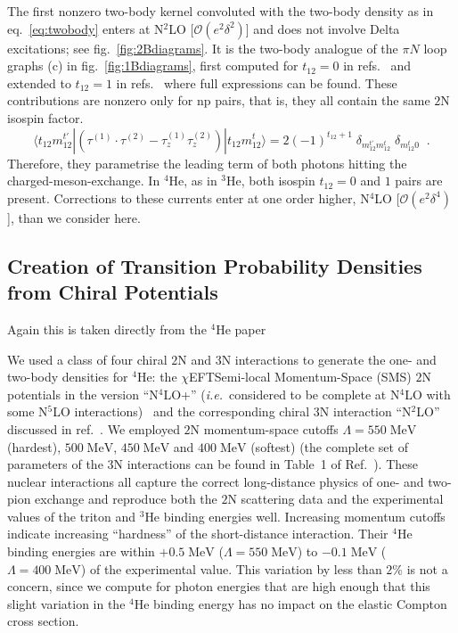 \documentclass[12pt]{article}
\newcommand{\ChiEFT}{$\chi$EFT\;}
\newcommand{\fourHe}{${}^{4} \mathrm{He}$\xspace}
\newcommand{\MeV}{\mathrm{MeV}}
\newcommand{\3}{\ss}
\newcommand{\ie}{\textit{i.e.}\xspace}
\newcommand{\NXLO}[1]{N\ensuremath{{}^{#1}}LO\xspace}
\newcommand{\threeHe}{\ensuremath{{}^3}He\xspace}
\newcommand{\N}{\mathrm{N}}
\newcommand{\calO}{\mathcal{O}} \newcommand{\calP}{\mathcal{P}}
\numberwithin{equation}{section}
\begin{document}
  The first nonzero two-body kernel convoluted with the two-body
  density as in eq.~\eqref{eq:twobody} enters at
  \NXLO{2} [$\calO(e^2 \delta^2)$]  and does not involve Delta
  excitations; see fig.~\ref{fig:2Bdiagrams}. It is the
  two-body analogue of the $\pi N$ loop graphs (c) in fig.~\ref{fig:1Bdiagrams},
  first computed for $t_{12}=0$ in refs.~\cite{Beane:1999uq,
  Beane:2004ra} and extended to $t_{12}=1$  in refs.~\cite{Choudhury:2007bh,
  Shukla:2008zc, ShuklaPhD} where full
  expressions can be found. These contributions are nonzero only for
  $\mathrm{np}$ pairs, that is, they all contain the same $2\N$ isospin factor.
  \begin{equation}
    \langle t_{12}m^{t\prime}_{12}|(\tau^{(1)} \cdot \tau^{(2)} -
    \tau^{(1)}_{z} \tau^{(2)}_{z})|t_{12}m^{t}_{12}\rangle=2(-1)^{t_{12}+1}\;
    \delta_{m^{t\prime}_{12}m^t_{12}}\;\delta_{m^t_{12}0}\;\;.
  \end{equation}
  Therefore, they parametrise the leading term of both photons hitting the
  charged-meson-exchange. In \fourHe, as in \threeHe, both isospin
  $t_{12}=0$ and $1$
  pairs are present. Corrections to these currents enter at one order higher,
  \NXLO{4} [$\calO(e^2\delta^4)$], than we consider here.
\subsection{Creation of Transition Probability Densities from
  Chiral Potentials}
\color{red} Again this is taken directly from the \fourHe paper \color{black}

\label{sec:potentials}

We used a class of four chiral $2$N and $3$N interactions to generate the one-
and two-body densities for \fourHe: the \ChiEFT Semi-local Momentum-Space (SMS)
$2\N$ potentials in the version ``\NXLO{4}+'' (\ie~considered to be complete at \NXLO{4} with
some \NXLO{5} interactions)~\cite{Reinert:2017usi} and the corresponding
chiral $3\N$ interaction ``\NXLO{2}'' discussed in ref.~\cite{Maris:2020qne}. We employed $2 \N$ momentum-space cutoffs $\Lambda=550\;\MeV$ (hardest),
$500\;\MeV$, $450\;\MeV$ and $400\;\MeV$ (softest) (the complete set of parameters of the 3N interactions can be found in Table~1 of Ref.~\cite{Le:2023bfj}). 
These nuclear interactions all capture the correct long-distance physics of one- and two-pion exchange and
reproduce both the $2\N$ scattering data and the experimental values of the
triton and \threeHe binding energies well. Increasing momentum cutoffs
indicate increasing ``hardness'' of the short-distance interaction. Their \fourHe binding
energies are within $+0.5\;\MeV$ ($\Lambda=550\;\MeV$) to $-0.1\;\MeV$
($\Lambda=400\;\MeV$) of the experimental value. This variation by less than $2\%$
is not a concern, since we compute for photon energies that are high enough that this slight variation in the \fourHe binding energy has no impact on the elastic Compton cross section.
\end{document}

